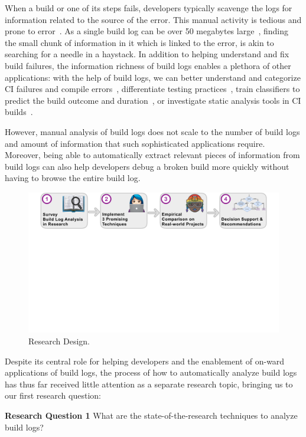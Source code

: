 When a build or one of its steps fails, developers typically
scavenge the logs for information related to the source of the error.
This manual activity is
tedious and prone to error~\cite{santolucito2018statically}.
As a
single build log can be over 50 megabytes large~\cite{beller2017oops},
finding the small chunk of information in it which is linked to the error,
is akin to searching for a
needle in a haystack.
In addition to helping understand and fix build failures, the information
richness of build logs enables a plethora of other applications: with
the help of
build logs, we can better understand and categorize CI
failures and compile
errors~\cite{islam2017insights,seo2014programmers}, differentiate
testing practices~\cite{orellana2017differences,vassallo2017a-tale},
train classifiers to predict the build outcome and
duration~\cite{ni2017cost,bisong2017built,machalica2019predictive}, or
investigate static analysis tools in CI
builds~\cite{zampetti2017open}.

However, manual analysis of build logs does not
scale to the number of build logs and amount of information that such
sophisticated applications require.
Moreover, being able to
automatically extract relevant pieces of information from build logs
can also help
developers debug a broken build more quickly without having to browse
the entire build log.

\begin{figure}[htb]
	\centering
	\includegraphics[width=\textwidth, trim={1.2cm 10.5cm 1.2cm 0cm},
	clip]{img/overview.pdf}
	\caption{Research Design.}
	\label{fig:overview}
\end{figure}

Despite its central role for helping developers and the enablement of
on-ward applications of build logs, the process of how to
automatically analyze build logs has thus far received little
attention as a separate research topic, bringing us to our first
research question:
\begin{simplebox}[minipage boxed title*=-5cm]{\textbf{Research Question
1}}
What are the state-of-the-research techniques to analyze build logs?
\end{simplebox}


